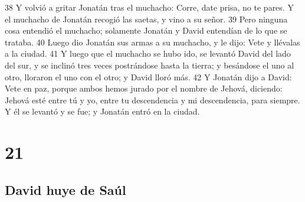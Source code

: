 38 Y volvió a gritar Jonatán tras el muchacho: Corre, date prisa, no te pares. Y el muchacho de Jonatán recogió las saetas, y vino a su señor.
39 Pero ninguna cosa entendió el muchacho; solamente Jonatán y David entendían de lo que se trataba.
40 Luego dio Jonatán sus armas a su muchacho, y le dijo: Vete y llévalas a la ciudad.
41 Y luego que el muchacho se hubo ido, se levantó David del lado del sur, y se inclinó tres veces postrándose hasta la tierra; y besándose el uno al otro, lloraron el uno con el otro; y David lloró más.
42 Y Jonatán dijo a David: Vete en paz, porque ambos hemos jurado por el nombre de Jehová, diciendo: Jehová esté entre tú y yo, entre tu descendencia y mi descendencia, para siempre. Y él se levantó y se fue; y Jonatán entró en la ciudad.

\chapter{21}

\section*{David huye de Saúl}


